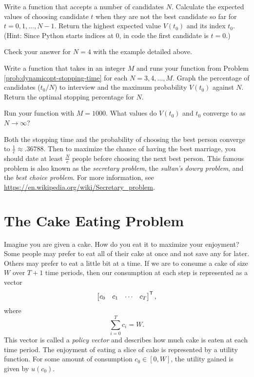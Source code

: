 \begin{problem}
Write a function that accepts a number of candidates $N$.
Calculate the expected values of choosing candidate $t$ when they are not the best candidate so far for $t=0,1,\ldots,N-1$.
Return the highest expected value $V(t_0)$ and its index $t_0$.
\\(Hint: Since Python starts indices at $0$, in code the first candidate is $t=0$.)

Check your answer for $N=4$ with the example detailed above.
\label{prob:dynamicopt-stopping-time}
\end{problem}

\begin{problem}
Write a function that takes in an integer $M$ and runs your function from Problem \ref{prob:dynamicopt-stopping-time} for each $N=3,4,\ldots,M$.
Graph the percentage of candidates ($t_0/N$) to interview and the maximum probability $V(t_0)$ against $N$.
Return the optimal stopping percentage for $N$.

Run your function with $M=1000$.
What values do $V(t_0)$ and $t_0$ converge to as $N\rightarrow\infty$?
\end{problem}

Both the stopping time and the probability of choosing the best person converge to $\frac{1}{e} \approx .36788$.
Then to maximize the chance of having the best marriage, you should date at least $\frac{N}{e}$ people before choosing the next best person.
This famous problem is also known as the \emph{secretary problem}, the \emph{sultan's dowry problem}, and the \emph{best choice problem}.
For more information, see \url{https://en.wikipedia.org/wiki/Secretary_problem}.

\section*{The Cake Eating Problem} %

Imagine you are given a cake.
How do you eat it to maximize your enjoyment?
Some people may prefer to eat all of their cake at once and not save any for later.
Others may prefer to eat a little bit at a time.
If we are to consume a cake of size $W$ over $T+1$ time periods, then our consumption at each step is represented as a vector
\[
\begin{bmatrix}c_0 & c_1 & \cdots & c_T\end{bmatrix}^{\mathsf T},
\]
where
\[
\sum_{i=0}^T c_i = W.
\]
This vector is called a \emph{policy vector} and describes how much cake is eaten at each time period.
The enjoyment of eating a slice of cake is represented by a utility function.
For some amount of consumption $c_0 \in [0, W]$, the utility gained is given by
$u(c_0)$.

